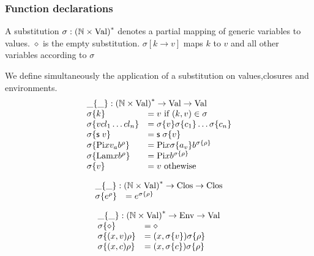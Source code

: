 \subsubsection{Function declarations}

\newcommand{\subst}[2]{#1\{#2\}}
\newcommand{\substClos}[2]{#1\{#2\}}
\newcommand{\substEnv}[2]{#1\{#2\}}
\newcommand{\compS}[2]{\mathrm{compS}#1\;#2}

\begin{definition}
A substitution $\sigma : {(\mathbb{N} \times \mathrm{Val})}^{\ast} $ denotes a partial mapping of generic variables to values.
$\diamond$ is the empty substitution.
$\sigma[k \rightarrow v] $ maps $k$ to $v$ and all other variables according to $\sigma$
\end{definition}
We define simultaneously the application of a substitution on values,closures and environments.
\[
\begin{array}{ll}
\multicolumn{2}{l}{\subst{\_}{\_} : \ves{(\cN \times \Val)} \ra \Val \ra \Val} \\
\subst{\sigma}{k} & = v \mbox{ if } (k,v) \in \sigma \\
\subst{\sigma}{v cl_1 \ldots cl_n} & = \subst{\sigma}{v} \substClos{\sigma}{c_1} \ldots \substClos{\sigma}{c_n}\\
\subst{\sigma}{\s v} & = \s \subst{\sigma}{v} \\
\subst{\sigma}{\vpi x v_a \cl{b}{\rho}} & = \vpi x \subst{\sigma}{a_v} \cl{b}{\subst{\sigma}{\rho}} \\
\subst{\sigma}{\vlam x \cl{b}{\rho}} & = \vpi x \cl{b}{\subst{\sigma}{\rho}} \\
\subst{\sigma}{v} & = v \mbox{ othewise }
\end{array}
\]

\[
\begin{array}{ll}
\multicolumn{2}{l}{\substClos{\_}{\_} : \ves{(\cN \times \Val)} \ra \Clos \ra \Clos} \\
\substClos{\sigma}{\cl{e}{\rho}} & = \cl{e}{\substEnv{\sigma}{\rho}} 
\end{array}
\]


\[
\begin{array}{ll}
\multicolumn{2}{l}{\substEnv{\_}{\_} : \ves{(\cN \times \Val)} \ra \Env \ra \Val} \\
\substEnv{\sigma}{\diamond} & = \diamond \\
\substEnv{\sigma}{(x,v)\rho} & = (x,\subst{\sigma}{v}) \substEnv{\sigma}{\rho} \\
\substEnv{\sigma}{(x,c)\rho} & = (x,\substClos{\sigma}{c}) \substEnv{\sigma}{\rho}
\end{array}
\]

